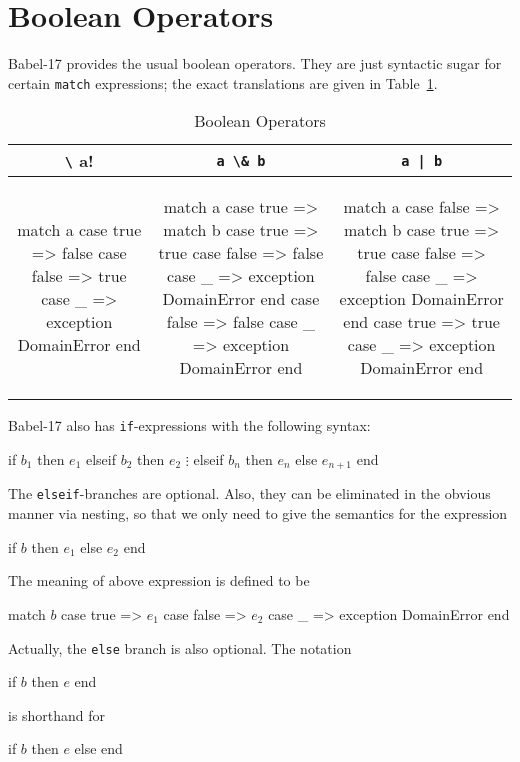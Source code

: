 \documentclass[11pt]{amsart}
\newcommand{\babelsrc}[1] {\lstinline!#1!}
\begin{document}
\section{Boolean Operators}

Babel-17 provides the usual boolean operators. They are just syntactic sugar for certain \babelsrc{match} expressions; the exact translations are given in Table~\ref{tab:booleanops}.
\begin{table}
\caption{Boolean Operators}
\begin{tabular}{c|c|c}
\babelsrc{\! a} & \babelsrc{a \& b} &\babelsrc{a | b} \\\hline
 \small
\begin{babellisting}
match a 
  case true => 
    false 
  case false => 
    true
  case _ => 
    exception DomainError
end
\end{babellisting}
 & 
 \small
\begin{babellisting}
match a 
  case true => 
    match b 
      case true => 
        true
      case false => 
        false
      case _ => 
        exception DomainError
    end 
  case false => 
    false
  case _ => 
    exception DomainError
end
\end{babellisting}
 & 
 \small
\begin{babellisting}
match a 
  case false => 
    match b 
      case true => 
        true
      case false => 
        false
      case _ => 
        exception DomainError
    end 
  case true => 
    true
  case _ => 
    exception DomainError
end
\end{babellisting}
\end{tabular}
\label{tab:booleanops}
\end{table}
Babel-17 also has \babelsrc{if}-expressions with the following syntax:
\begin{babellisting}
if $b_1$ then
  $e_1$
elseif $b_2$ then
  $e_2$
  $\vdots$
elseif $b_n$ then
  $e_n$
else
  $e_{n+1}$
end
\end{babellisting}
The \babelsrc{elseif}-branches are  optional. Also, they can be eliminated in the obvious manner via nesting, so that we only need to give the semantics for the expression
\begin{babellisting}
if $b$ then $e_1$ else $e_2$ end
\end{babellisting}
The meaning of above expression is defined to be
\begin{babellisting}
match $b$ 
  case true => $e_1$
  case false => $e_2$
  case _ => exception DomainError 
end
\end{babellisting}
Actually, the  \babelsrc{else} branch is also optional. The notation
\begin{babellisting}
if $b$ then $e$  end
\end{babellisting}
is shorthand for
\begin{babellisting}
if $b$ then $e$  else end
\end{babellisting}
\end{document}
